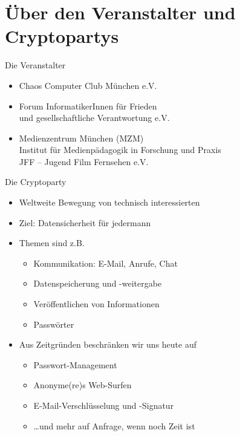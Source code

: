\section{Über den Veranstalter und Cryptopartys}
  \begin{frame}{Die Veranstalter}
    \begin{itemize}
      \item Chaos Computer Club München e.V.
      \item Forum InformatikerInnen für Frieden\\und gesellschaftliche Verantwortung e.V.
      \item Medienzentrum München (MZM)\\Institut für Medienpädagogik in Forschung und Praxis\\JFF -- Jugend Film Fernsehen e.V.
    \end{itemize}
  \end{frame}
  \begin{frame}{Die Cryptoparty}
    \begin{itemize}
      \item Weltweite Bewegung von technisch interessierten
      \item Ziel: Datensicherheit für jedermann
      \item Themen sind z.B.
      \begin{itemize}
        \item Kommunikation: E-Mail, Anrufe, Chat
        \item Datenspeicherung und -weitergabe
        \item Veröffentlichen von Informationen
        \item Passwörter
      \end{itemize}
      \item Aus Zeitgründen beschränken wir uns heute auf 
      \begin{itemize}
        \item Passwort-Management
        \item Anonyme(re)s Web-Surfen
        \item E-Mail-Verschlüsselung und -Signatur
        \item \ldots und mehr auf Anfrage, wenn noch Zeit ist
      \end{itemize}
    \end{itemize}
  \end{frame}

